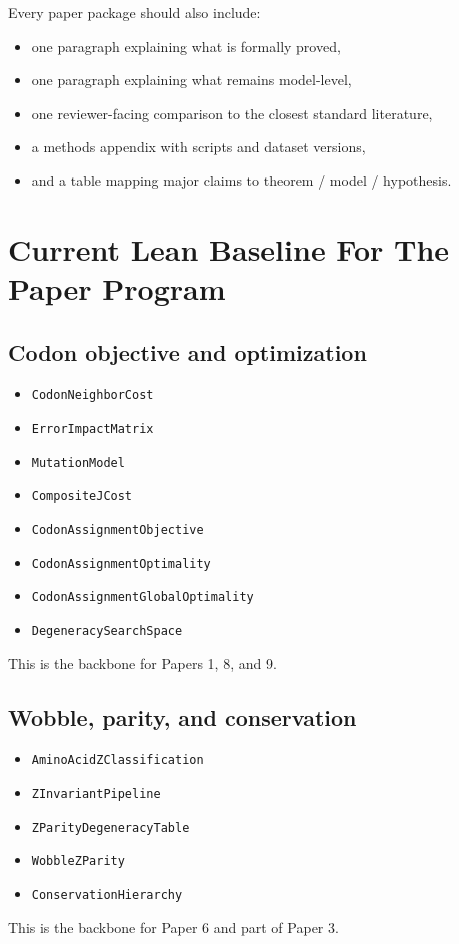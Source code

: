 \documentclass[11pt]{article}
\begin{document}
Every paper package should also include:
\begin{itemize}
\item one paragraph explaining what is formally proved,
\item one paragraph explaining what remains model-level,
\item one reviewer-facing comparison to the closest standard literature,
\item a methods appendix with scripts and dataset versions,
\item and a table mapping major claims to theorem / model / hypothesis.
\end{itemize}

\section*{Current Lean Baseline For The Paper Program}

\subsection*{Codon objective and optimization}
\begin{itemize}
\item \texttt{CodonNeighborCost}
\item \texttt{ErrorImpactMatrix}
\item \texttt{MutationModel}
\item \texttt{CompositeJCost}
\item \texttt{CodonAssignmentObjective}
\item \texttt{CodonAssignmentOptimality}
\item \texttt{CodonAssignmentGlobalOptimality}
\item \texttt{DegeneracySearchSpace}
\end{itemize}
This is the backbone for Papers 1, 8, and 9.

\subsection*{Wobble, parity, and conservation}
\begin{itemize}
\item \texttt{AminoAcidZClassification}
\item \texttt{ZInvariantPipeline}
\item \texttt{ZParityDegeneracyTable}
\item \texttt{WobbleZParity}
\item \texttt{ConservationHierarchy}
\end{itemize}
This is the backbone for Paper 6 and part of Paper 3.
\end{document}
